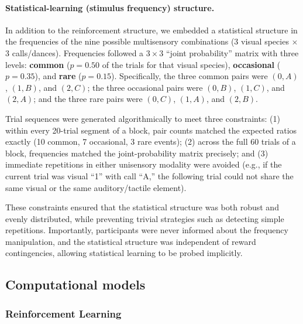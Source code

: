 \documentclass{article}
\begin{document}
\paragraph{Statistical-learning (stimulus frequency) structure.}
In addition to the reinforcement structure, we embedded a statistical structure in the frequencies of the nine possible multisensory combinations (3 visual species $\times$ 3 calls/dances). Frequencies followed a $3\times 3$ “joint probability” matrix with three levels: \textbf{common} ($p=0.50$ of the trials for that visual species), \textbf{occasional} ($p=0.35$), and \textbf{rare} ($p=0.15$). Specifically, the three common pairs were $(0,A)$, $(1,B)$, and $(2,C)$; the three occasional pairs were $(0,B)$, $(1,C)$, and $(2,A)$; and the three rare pairs were $(0,C)$, $(1,A)$, and $(2,B)$. 

Trial sequences were generated algorithmically to meet three constraints: 
(1) within every 20-trial segment of a block, pair counts matched the expected ratios exactly (10 common, 7 occasional, 3 rare events); 
(2) across the full 60 trials of a block, frequencies matched the joint-probability matrix precisely; and 
(3) immediate repetitions in either unisensory modality were avoided (e.g., if the current trial was visual “1” with call “A,” the following trial could not share the same visual or the same auditory/tactile element). 

These constraints ensured that the statistical structure was both robust and evenly distributed, while preventing trivial strategies such as detecting simple repetitions. Importantly, participants were never informed about the frequency manipulation, and the statistical structure was independent of reward contingencies, allowing statistical learning to be probed implicitly.

\subsection*{Computational models}

\subsubsection*{Reinforcement Learning}
\end{document}
